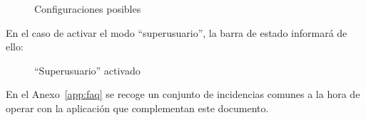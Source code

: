\begin{figure} [!htb]
	\centering
	\caption{Configuraciones posibles}
	\label{fig:configuracionesPosibles}
\end{figure}

En el caso de activar el modo ``superusuario'', la barra de estado informará de ello:

\begin{figure} [!htb]
	\centering
	\caption{``Superusuario'' activado}
	\label{fig:superusuarioActivado}
\end{figure}

En el Anexo~\ref{app:faq} se recoge un conjunto de incidencias comunes a la hora de operar con la aplicación que complementan este documento.





